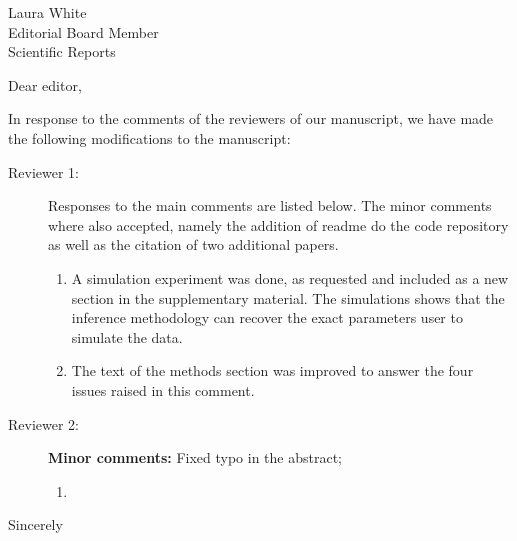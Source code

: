 \documentclass[a4paper,10pt]{letter}
\begin{document}

\begin{letter}{Laura White\\Editorial Board Member\\Scientific Reports }
\address{Escola de Matem\'atica Aplicada\\Funda\c{c}\~ao Getulio Vargas 
(FGV)\\Rio de Janeiro -- RJ\\Brazil.}

\opening{Dear editor,}

In response to the comments of the reviewers of our manuscript, we have made 
the following modifications to the manuscript:

\begin{description}
 \item[Reviewer 1:] Responses to the main comments are listed below. The minor 
comments where also accepted, namely the addition of readme do the code 
repository as well as the citation of two  additional papers. 
 
 \begin{enumerate}
  \item A simulation experiment was done, as requested and included as a new 
section in the supplementary material. The simulations shows that the inference 
methodology can recover the exact parameters user to simulate  the data.
\item The text of the methods section was improved to answer the four issues 
raised in this comment.
 \end{enumerate}

 \item [Reviewer 2:] \textbf{Minor comments:} Fixed typo in the abstract; 
 \begin{enumerate}
  \item 
 \end{enumerate}

\end{description}



\signature{Flávio Codeço Coelho\\Professor}

\closing{Sincerely}


\end{letter}
\end{document}
